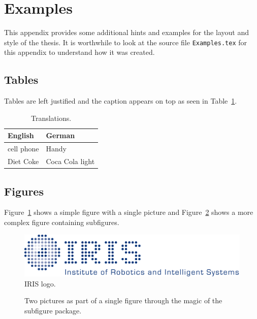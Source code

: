 \section{Examples}
\label{s:Examples}

This appendix provides some additional hints and examples for the
layout and style of the thesis. It is worthwhile to look at the source
file \verb|Examples.tex| for this appendix to understand how it was
created.



\subsection{Tables}

Tables are left justified and the caption appears on top as seen in
Table~\ref{t:Translations}.

\begin{table}[ht]
\caption[Translations]{\label{t:Translations}Translations.}
\begin{tabular}{ll}
\hline
\textbf{English} & \textbf{German}\\
\hline
cell phone       & Handy\\
Diet Coke        & Coca Cola light\\
\hline
\end{tabular}
\end{table}



\subsection{Figures}

Figure~\ref{f:IRISlogo} shows a simple figure with a single picture
and Figure~\ref{f:SubfigureExample} shows a more complex figure
containing subfigures.

\begin{figure}[ht]
\centering
\includegraphics[width=.6\linewidth]{Logos/IRISlogo}
\caption[IRIS logo]{\label{f:IRISlogo}IRIS logo.}
\end{figure}

\begin{figure}[ht]
\centering
{}\quad
{}
\caption[Subfigure example]{\label{f:SubfigureExample}Two pictures as
  part of a single figure through the magic of the subfigure package.}
\end{figure}



